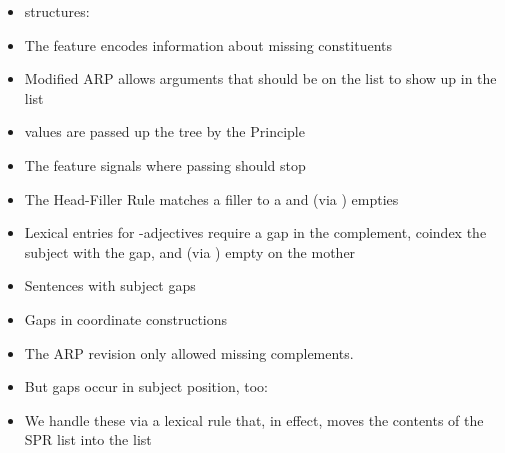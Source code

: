 \documentclass[a4paper,landscape,headrule,footrule]{foils}
\begin{document}

\begin{itemize}
\item {} structures:
  \begin{exe}
   \ex {}
   \ex {}
 \end{exe}
\item The feature  encodes information about
missing constituents
\item Modified ARP allows arguments that should be on
the  list to show up in the  list
\item {} values are passed up the tree by the 
Principle
\newpage
\item The feature  signals where  passing
should stop
\item The Head-Filler Rule matches a filler to a  and
(via ) empties 
\item Lexical entries for -adjectives require a gap in
the complement, coindex the subject with the gap,
and (via ) empty  on the mother
\end{itemize}


\begin{itemize}
\item Sentences with subject gaps
\item Gaps in coordinate constructions
\end{itemize}

\begin{itemize}
\item The ARP revision only allowed missing
complements.
\item But gaps occur in subject position, too:
  \begin{exe}
    \ex {}
  \end{exe}
\item We handle these via a lexical rule that, in effect,
moves the contents of the SPR list into the  list
\end{itemize}

\end{document}

